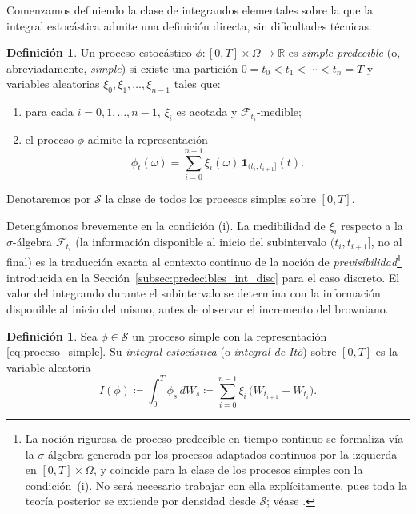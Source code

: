 \documentclass[11pt,a4paper,oneside]{report}
\theoremstyle{plain}
\theoremstyle{definition}
\newtheorem{definicion}[teorema]{Definición}
\theoremstyle{remark}
\newcommand{\R}{\mathbb{R}}
\newcommand{\F}{\mathcal{F}}
\newcommand{\1}{\mathbf{1}}
\newcommand{\eqdef}{\coloneqq}
\begin{document}
Comenzamos definiendo la clase de integrandos elementales sobre la
que la integral estocástica admite una definición directa, sin
dificultades técnicas.

\begin{definicion}
\label{def:proceso_simple}
Un proceso estocástico $\phi : [0, T] \times \Omega \to \R$ es
\emph{simple predecible} (o, abreviadamente, \emph{simple}) si
existe una partición $0 = t_0 < t_1 < \cdots < t_n = T$ y variables
aleatorias $\xi_0, \xi_1, \ldots, \xi_{n-1}$ tales que:
\begin{enumerate}[label=\textnormal{(\roman*)}]
  \item para cada $i = 0, 1, \ldots, n-1$, $\xi_i$ es acotada y
        $\F_{t_i}$-medible;
  \item el proceso $\phi$ admite la representación
        \begin{equation}\label{eq:proceso_simple}
          \phi_t(\omega) = \sum_{i=0}^{n-1} \xi_i(\omega)\,
                           \mathbf{1}_{(t_i, t_{i+1}]}(t).
        \end{equation}
\end{enumerate}
Denotaremos por $\mathcal{S}$ la clase de todos los procesos simples
sobre $[0, T]$.
\end{definicion}

Detengámonos brevemente en la condición (i). La medibilidad de
$\xi_i$ respecto a la $\sigma$-álgebra $\F_{t_i}$ (la información
disponible al inicio del subintervalo $(t_i, t_{i+1}]$, no al final) es la traducción exacta al contexto continuo de la noción de
\emph{previsibilidad}\footnote{La noción rigurosa de proceso
predecible en tiempo continuo se formaliza vía la
$\sigma$-álgebra generada por los procesos adaptados continuos por
la izquierda en $[0, T] \times \Omega$, y coincide para la clase
de los procesos simples con la condición~(i). No será necesario
trabajar con ella explícitamente, pues toda la teoría posterior se
extiende por densidad desde $\mathcal{S}$; véase
\cite{karatzas-shreve}.} introducida en la
Sección~\ref{subsec:predecibles_int_disc} para el caso discreto. El
valor del integrando durante el subintervalo se determina con la
información disponible al inicio del mismo, antes de observar el
incremento del browniano.

\medskip

\begin{definicion}
\label{def:integral_simple}
Sea $\phi \in \mathcal{S}$ un proceso simple con la representación
\eqref{eq:proceso_simple}. Su \emph{integral estocástica} (o
\emph{integral de Itô}) sobre $[0, T]$ es la variable aleatoria
\begin{equation}\label{eq:integral_simple}
  I(\phi) \eqdef \int_0^T \phi_s\, dW_s
            \eqdef \sum_{i=0}^{n-1} \xi_i\,
                   \bigl(W_{t_{i+1}} - W_{t_i}\bigr).
\end{equation}
\end{definicion}
\end{document}
